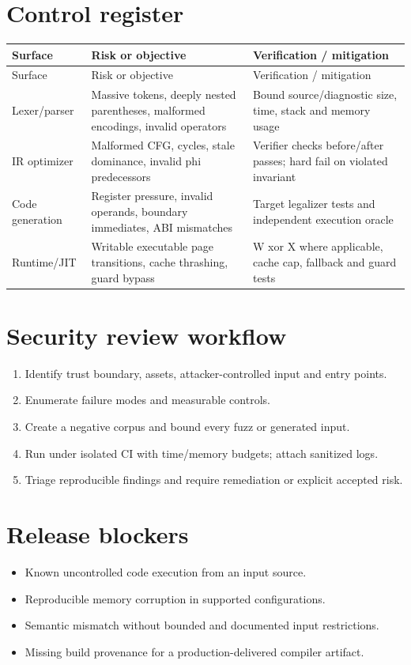 \documentclass[10pt,letterpaper]{article}
\begin{document}
\section{Control register}
\begin{longtable}{|>{\raggedright\arraybackslash}p{}|>{\raggedright\arraybackslash}p{}|>{\raggedright\arraybackslash}p{}|}
\hline
Surface & Risk or objective & Verification / mitigation\\ \hline\endfirsthead
\hline
Surface & Risk or objective & Verification / mitigation\\ \hline\endhead
Lexer/parser & Massive tokens, deeply nested parentheses, malformed encodings, invalid operators & Bound source/diagnostic size, time, stack and memory usage\\ \hline
IR optimizer & Malformed CFG, cycles, stale dominance, invalid phi predecessors & Verifier checks before/after passes; hard fail on violated invariant\\ \hline
Code generation & Register pressure, invalid operands, boundary immediates, ABI mismatches & Target legalizer tests and independent execution oracle\\ \hline
Runtime/JIT & Writable executable page transitions, cache thrashing, guard bypass & W xor X where applicable, cache cap, fallback and guard tests\\ \hline
\end{longtable}

\section{Security review workflow}
\begin{enumerate}
\item Identify trust boundary, assets, attacker-controlled input and entry points.
\item Enumerate failure modes and measurable controls.
\item Create a negative corpus and bound every fuzz or generated input.
\item Run under isolated CI with time/memory budgets; attach sanitized logs.
\item Triage reproducible findings and require remediation or explicit accepted risk.
\end{enumerate}

\section{Release blockers}
\begin{itemize}
\item Known uncontrolled code execution from an input source.
\item Reproducible memory corruption in supported configurations.
\item Semantic mismatch without bounded and documented input restrictions.
\item Missing build provenance for a production-delivered compiler artifact.
\end{itemize}
\end{document}
